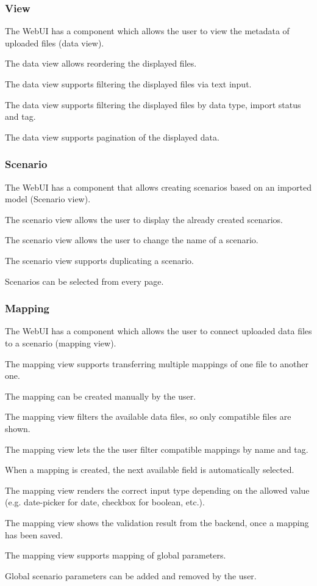 \subsubsection{View}
\reqstartF
\item The WebUI has a component which allows the user to view the metadata of uploaded files (data view).
\item The data view allows reordering the displayed files.
\item The data view supports filtering the displayed files via text input.
\item The data view supports filtering the displayed files by data type, import status and tag.
\item The data view supports pagination of the displayed data.
\reqendF

\subsubsection{Scenario}
\reqstartF
\item The WebUI has a component that allows creating scenarios based on an imported model (Scenario view).
\item The scenario view allows the user to display the already created scenarios.
\item The scenario view allows the user to change the name of a scenario.
\item The scenario view supports duplicating a scenario.
\item Scenarios can be selected from every page.
\reqendF

\subsubsection{Mapping}
\reqstartF
\item The WebUI has a component which allows the user to connect uploaded data files to a scenario (mapping view).
\item The mapping view supports transferring multiple mappings of one file to another one.
\item The mapping can be created manually by the user.
\item The mapping view filters the available data files, so only compatible files are shown.
\item The mapping view lets the the user filter compatible mappings by name and tag.
\item When a mapping is created, the next available field is automatically selected.
\item The mapping view renders the correct input type depending on the allowed value (e.g. date-picker for date, checkbox for boolean, etc.).
\item The mapping view shows the validation result from the backend, once a mapping has been saved.
\item The mapping view supports mapping of global parameters.
\item Global scenario parameters can be added and removed by the user.
\reqendF


